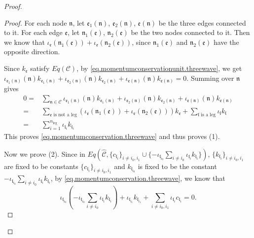 \begin{proof}
\begin{proof}
For each node $\mathfrak{n}$, let $\mathfrak{e}_1(\mathfrak{n})$, $\mathfrak{e}_2(\mathfrak{n})$, $\mathfrak{e}(\mathfrak{n})$ be the three edges connected to it. For each edge $\mathfrak{e}$, let $\mathfrak{n}_1(\mathfrak{e})$, $\mathfrak{n}_2(\mathfrak{e})$ be the two nodes connected to it. Then we know that $\iota_{\mathfrak{e}}(\mathfrak{n}_1(\mathfrak{e}))+\iota_{\mathfrak{e}}(\mathfrak{n}_2(\mathfrak{e}))$, since $\mathfrak{n}_1(\mathfrak{e})$ and $\mathfrak{n}_2(\mathfrak{e})$ have the opposite direction. 

Since $k_{\mathfrak{e}}$ satisfy $Eq(\mathcal{C})$, by \eqref{eq.momentumconservationunit.threewave}, we get $\iota_{\mathfrak{e}_1(\mathfrak{n})}(\mathfrak{n})k_{\mathfrak{e}_1(\mathfrak{n})}+\iota_{\mathfrak{e}_2(\mathfrak{n})}(\mathfrak{n})k_{\mathfrak{e}_2(\mathfrak{n})}+\iota_{\mathfrak{e}(\mathfrak{n})}(\mathfrak{n})k_{\mathfrak{e}(\mathfrak{n})}=0$. Summing over $\mathfrak{n}$ gives 
\begin{equation}
\begin{split}
    0=&\sum_{\mathfrak{n}\in \mathcal{C}}\iota_{\mathfrak{e}_1(\mathfrak{n})}(\mathfrak{n})k_{\mathfrak{e}_1(\mathfrak{n})}+\iota_{\mathfrak{e}_2(\mathfrak{n})}(\mathfrak{n})k_{\mathfrak{e}_2(\mathfrak{n})}+\iota_{\mathfrak{e}(\mathfrak{n})}(\mathfrak{n})k_{\mathfrak{e}(\mathfrak{n})}
    \\
    =& \sum_{\mathfrak{e}\text{ is not a leg}} 
    (\iota_{\mathfrak{e}}(\mathfrak{n}_1(\mathfrak{e}))+\iota_{\mathfrak{e}}(\mathfrak{n}_2(\mathfrak{e}))) k_{\mathfrak{e}}+ \sum_{\mathfrak{l}\text{ is a leg}} 
    \iota_{\mathfrak{l}} k_{\mathfrak{l}}
    \\
    =& \sum_{i=1}^{n_{\text{leg}}} \iota_{\mathfrak{l}_i}k_{\mathfrak{l}_i}
\end{split}
\end{equation}
This proves \eqref{eq.momentumconservation.threewave} and thus proves (1).

Now we prove (2). Since in $Eq\left(\widehat{\mathcal{C}}, \{c_{\mathfrak{l}_{i}}\}_{i\ne i_0, i_1}\cup \{-\iota_{\mathfrak{l}_{i_0}}\sum_{i\ne i_0} \iota_{\mathfrak{l}_i}k_{\mathfrak{l}_i}\}\right)$, $\{k_{\mathfrak{l}_{i}}\}_{i\ne i_0, i_1}$ are fixed to be constants $\{c_{\mathfrak{l}_{i}}\}_{i\ne i_0, i_1}$ and $k_{\mathfrak{l}_{i_0}}$ is fixed to be the constant $-\iota_{\mathfrak{l}_{i_0}}\sum_{i\ne i_0} \iota_{\mathfrak{l}_i}k_{\mathfrak{l}_i}$, by \eqref{eq.momentumconservation.threewave}, we know that 
\begin{equation}
    \iota_{\mathfrak{l}_{i_0}}\left(-\iota_{\mathfrak{l}_{i_0}}\sum_{i\ne i_0} \iota_{\mathfrak{l}_i}k_{\mathfrak{l}_i}\right)+ \iota_{\mathfrak{l}_{i_1}}k_{\mathfrak{l}_{i_1}}+\sum_{i\ne i_0, i_1} \iota_{\mathfrak{l}_i}c_{\mathfrak{l}_i}=0.
\end{equation}


\end{proof}
\end{proof}

